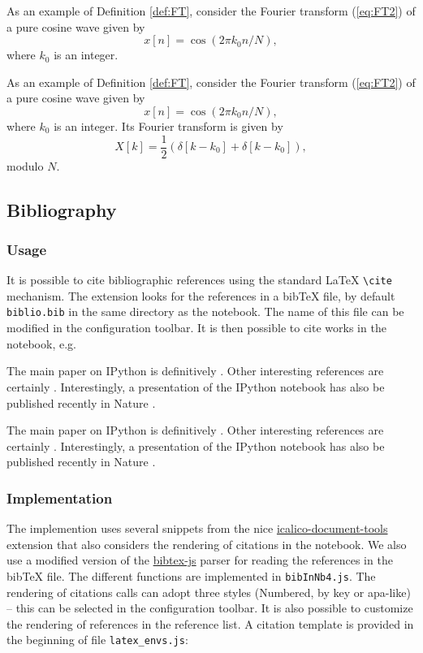 \begin{listing}
As an example of Definition \ref{def:FT}, consider the Fourier transform (\ref{eq:FT2}) of a pure cosine wave given by
$$
x[n]= \cos(2\pi k_0 n/N),
$$
where $k_0$ is an integer. 
\end{listing}

    As an example of Definition \ref{def:FT}, consider the Fourier transform
(\ref{eq:FT2}) of a pure cosine wave given by \[
x[n]= \cos(2\pi k_0 n/N),
\] where \(k_0\) is an integer. Its Fourier transform is given by \[
X[k] = \frac{1}{2} \left( \delta[k-k_0] + \delta[k-k_0] \right), 
\] modulo \(N\).

    \subsection{Bibliography}\label{bibliography}

    \subsubsection{Usage}\label{usage}

    It is possible to cite bibliographic references using the standard LaTeX
\texttt{\textbackslash{}cite} mechanism. The extension looks for the
references in a bibTeX file, by default \texttt{biblio.bib} in the same
directory as the notebook. The name of this file can be modified in the
configuration toolbar. It is then possible to cite works in the
notebook, e.g.

\begin{listing}
The main paper on IPython is definitively \cite{PER-GRA:2007}. Other interesting references are certainly \cite{mckinney2012python, rossant2013learning}. Interestingly, a presentation of the IPython notebook has also be published recently in Nature \cite{shen2014interactive}.
\end{listing}

The main paper on IPython is definitively \cite{PER-GRA:2007}. Other
interesting references are certainly
\cite{mckinney2012python, rossant2013learning}. Interestingly, a
presentation of the IPython notebook has also be published recently in
Nature \cite{shen2014interactive}.

    \subsubsection{Implementation}\label{implementation}

    The implemention uses several snippets from the nice
\href{https://bitbucket.org/ipre/calico/downloads/}{icalico-document-tools}
extension that also considers the rendering of citations in the
notebook. We also use a modified version of the
\href{https://code.google.com/p/bibtex-js/}{bibtex-js} parser for
reading the references in the bibTeX file. The different functions are
implemented in \texttt{bibInNb4.js}. The rendering of citations calls
can adopt three styles (Numbered, by key or apa-like) -- this can be
selected in the configuration toolbar. It is also possible to customize
the rendering of references in the reference list. A citation template
is provided in the beginning of file \texttt{latex\_envs.js}:

